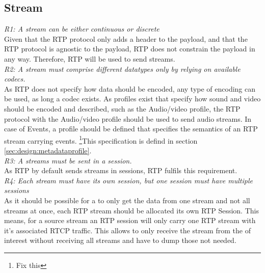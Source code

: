 


\subsection{Stream}
\textit{R1: A stream can be either continuous or discrete} \\
Given that the RTP protocol only adds a header to the payload, and that the RTP protocol is agnostic to the payload, RTP does not constrain the payload in any way. Therefore, RTP will be used to send streams.\\

\noindent\textit{R2: A stream must comprise different datatypes only by relying on available codecs.}\\
As RTP does not specify how data should be encoded, any type of encoding can be used, as long a codec exists. As profiles exist that specify how sound and video should be encoded and described, such as the Audio/video profile, the RTP protocol with the Audio/video profile should be used to send audio streams. In case of Events, a profile should be defined that specifies the semantics of an RTP stream carrying events. \footnote{Fix this}This specification is defind in section \ref{sec:design:metadataprofile}. \\

\noindent\textit{R3: A streams must be sent in a session.}\\
As RTP by default sends streams in sessions, RTP fulfils this requirement.\\

\noindent\textit{R4: Each stream must have its own session, but one session must have multiple sessions}\\
\noindent{}As it should be possible for a \sub{} to only get the data from one stream and not all streams at once, each RTP stream should be allocated its own RTP Session. This means, for a source stream an RTP session will only carry one RTP stream with it's associated RTCP traffic. This allows  to only receive the stream from the  of interest without receiving all streams and have to dump those not needed.\\

